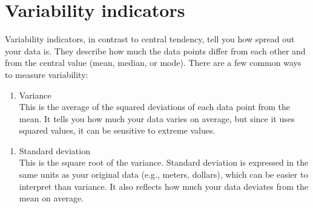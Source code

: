 \documentclass[
]{book}
\newenvironment{Shaded}{\begin{snugshade}}{\end{snugshade}}
\newcommand{\CommentTok}[1]{\textcolor[rgb]{0.56,0.35,0.01}{\textit{#1}}}
\newcommand{\FunctionTok}[1]{\textcolor[rgb]{0.13,0.29,0.53}{\textbf{#1}}}
\newcommand{\NormalTok}[1]{#1}
\newcommand{\SpecialCharTok}[1]{\textcolor[rgb]{0.81,0.36,0.00}{\textbf{#1}}}
\providecommand{\tightlist}{%
  \setlength{\itemsep}{0pt}\setlength{\parskip}{0pt}}
\begin{document}
\hypertarget{variability-indicators}{%
\section{Variability indicators}\label{variability-indicators}}

Variability indicators, in contrast to central tendency, tell you how spread out your data is. They describe how much the data points differ from each other and from the central value (mean, median, or mode). There are a few common ways to measure variability:

\begin{enumerate}
\def\labelenumi{\arabic{enumi}.}
\tightlist
\item
  Variance\\
  This is the average of the squared deviations of each data point from the mean. It tells you how much your data varies on average, but since it uses squared values, it can be sensitive to extreme values.
\end{enumerate}

\begin{Shaded}
\end{Shaded}

\begin{enumerate}
\def\labelenumi{\arabic{enumi}.}
\setcounter{enumi}{1}
\tightlist
\item
  Standard deviation\\
  This is the square root of the variance. Standard deviation is expressed in the same units as your original data (e.g., meters, dollars), which can be easier to interpret than variance. It also reflects how much your data deviates from the mean on average.
\end{enumerate}

\begin{Shaded}
\end{Shaded}
\end{document}
